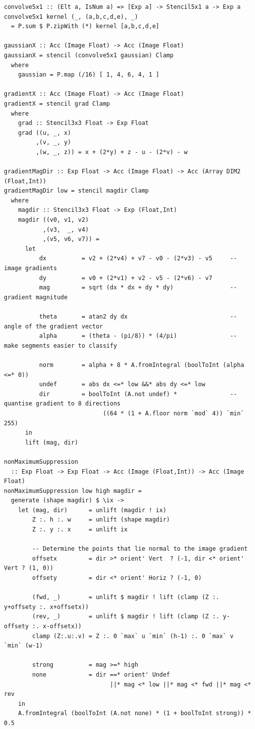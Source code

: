 \begin{lstlisting}[style=haskell_float
    ,label=lst:canny
    ,caption={Canny edge detection}]
convolve5x1 :: (Elt a, IsNum a) => [Exp a] -> Stencil5x1 a -> Exp a
convolve5x1 kernel (_, (a,b,c,d,e), _)
  = P.sum $ P.zipWith (*) kernel [a,b,c,d,e]

gaussianX :: Acc (Image Float) -> Acc (Image Float)
gaussianX = stencil (convolve5x1 gaussian) Clamp
  where
    gaussian = P.map (/16) [ 1, 4, 6, 4, 1 ]

gradientX :: Acc (Image Float) -> Acc (Image Float)
gradientX = stencil grad Clamp
  where
    grad :: Stencil3x3 Float -> Exp Float
    grad ((u, _, x)
         ,(v, _, y)
         ,(w, _, z)) = x + (2*y) + z - u - (2*v) - w

gradientMagDir :: Exp Float -> Acc (Image Float) -> Acc (Array DIM2 (Float,Int))
gradientMagDir low = stencil magdir Clamp
  where
    magdir :: Stencil3x3 Float -> Exp (Float,Int)
    magdir ((v0, v1, v2)
           ,(v3,  _, v4)
           ,(v5, v6, v7)) =
      let
          dx          = v2 + (2*v4) + v7 - v0 - (2*v3) - v5     -- image gradients
          dy          = v0 + (2*v1) + v2 - v5 - (2*v6) - v7
          mag         = sqrt (dx * dx + dy * dy)                -- gradient magnitude

          theta       = atan2 dy dx                             -- angle of the gradient vector
          alpha       = (theta - (pi/8)) * (4/pi)               -- make segments easier to classify

          norm        = alpha + 8 * A.fromIntegral (boolToInt (alpha <=* 0))
          undef       = abs dx <=* low &&* abs dy <=* low
          dir         = boolToInt (A.not undef) *               -- quantise gradient to 8 directions
                            ((64 * (1 + A.floor norm `mod` 4)) `min` 255)
      in
      lift (mag, dir)

nonMaximumSuppression
  :: Exp Float -> Exp Float -> Acc (Image (Float,Int)) -> Acc (Image Float)
nonMaximumSuppression low high magdir =
  generate (shape magdir) $ \ix ->
    let (mag, dir)      = unlift (magdir ! ix)
        Z :. h :. w     = unlift (shape magdir)
        Z :. y :. x     = unlift ix

        -- Determine the points that lie normal to the image gradient
        offsetx         = dir >* orient' Vert  ? (-1, dir <* orient' Vert ? (1, 0))
        offsety         = dir <* orient' Horiz ? (-1, 0)

        (fwd, _)        = unlift $ magdir ! lift (clamp (Z :. y+offsety :. x+offsetx))
        (rev, _)        = unlift $ magdir ! lift (clamp (Z :. y-offsety :. x-offsetx))
        clamp (Z:.u:.v) = Z :. 0 `max` u `min` (h-1) :. 0 `max` v `min` (w-1)

        strong          = mag >=* high
        none            = dir ==* orient' Undef
                              ||* mag <* low ||* mag <* fwd ||* mag <* rev
    in
    A.fromIntegral (boolToInt (A.not none) * (1 + boolToInt strong)) * 0.5
\end{lstlisting}


